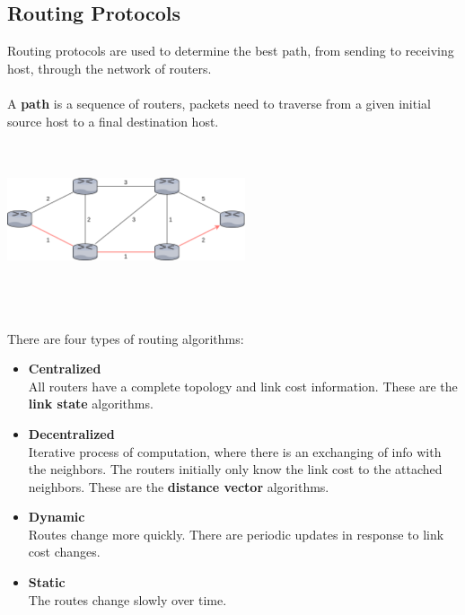 \documentclass{article}
\begin{document}
\subsection{Routing Protocols}
Routing protocols are used to determine the best path, from sending to receiving host, through the network of routers. \\ \\
A \textbf{path} is a sequence of routers, packets need to traverse from a given initial source host to a final destination host. \\ \\ \\
\centerline{\includegraphics[width=7cm]{./assets/graph.png}} \\ \\ \\
There are four types of routing algorithms:
\begin{itemize}
	\item \textbf{Centralized}
	\vspace{.2cm} \\
	All routers have a complete topology and link cost information. These are the \textbf{link state} algorithms.
	
	\item \textbf{Decentralized}
	\vspace{.2cm} \\
	Iterative process of computation, where there is an exchanging of info with the neighbors. The routers initially only know the link cost to the attached neighbors. These are the \textbf{distance vector} algorithms.
	
	\item \textbf{Dynamic}
	\vspace{.2cm} \\
	Routes change more quickly. There are periodic updates in response to link cost changes.
	
	\item \textbf{Static}
	\vspace{.2cm} \\
	The routes change slowly over time.
\end{itemize}
\end{document}
